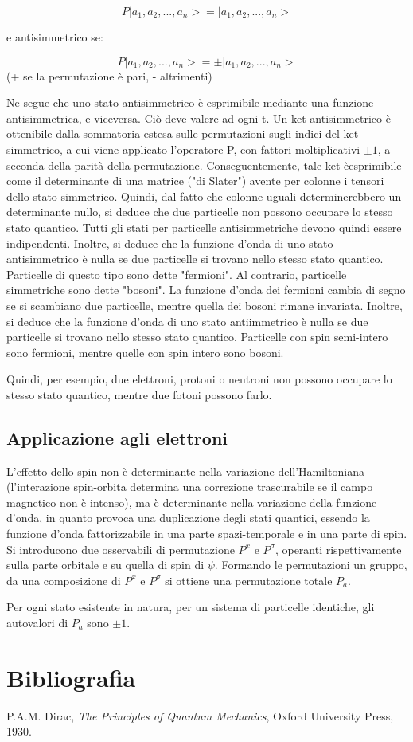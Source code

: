 \documentclass{article}
\begin{document}
\begin{equation}
    P|a_1,a_2,...,a_n>=|a_1,a_2,...,a_n>
\end{equation}

e antisimmetrico se:

\begin{equation}
    P|a_1,a_2,...,a_n>=\pm|a_1,a_2,...,a_n>
\end{equation}
(+ se la permutazione è pari, - altrimenti)

Ne segue che uno stato antisimmetrico è esprimibile mediante una funzione antisimmetrica, e viceversa.
Ciò deve valere ad ogni t.
Un ket antisimmetrico è ottenibile dalla sommatoria estesa sulle permutazioni sugli indici del ket simmetrico, a cui viene applicato l'operatore P, con fattori moltiplicativi $\pm 1$, a
seconda della parità della permutazione.
Conseguentemente, tale ket èesprimibile come il determinante di una matrice ("di Slater") avente per colonne i tensori dello stato simmetrico.
Quindi, dal fatto che colonne uguali determinerebbero un determinante nullo, si deduce che due particelle non possono occupare lo stesso stato quantico.
Tutti gli stati per particelle antisimmetriche devono quindi essere indipendenti.
Inoltre, si deduce che la funzione d'onda di uno stato antisimmetrico è nulla se due particelle si trovano nello stesso stato quantico.
Particelle di questo tipo sono dette "fermioni".
Al contrario, particelle simmetriche sono dette "bosoni".
La funzione d'onda dei fermioni cambia di segno se si scambiano due particelle, mentre quella dei bosoni rimane invariata.
Inoltre, si deduce che la funzione d'onda di uno stato antiimmetrico è nulla se due particelle si trovano nello stesso stato quantico.
Particelle con spin semi-intero sono fermioni, mentre quelle con spin intero sono bosoni.

Quindi, per esempio, due elettroni, protoni o neutroni non possono occupare lo stesso stato quantico, mentre due fotoni possono farlo.

\subsection*{Applicazione agli elettroni}
L'effetto dello spin non è determinante nella variazione dell'Hamiltoniana (l'interazione spin-orbita determina una correzione trascurabile se il campo
magnetico non è intenso), ma è determinante nella variazione della funzione d'onda, in quanto provoca una duplicazione degli stati quantici,
essendo la funzione d'onda fattorizzabile in una parte spazi-temporale e in una parte di spin.
Si introducono due osservabili di permutazione $P^x$ e $P^\sigma$, operanti rispettivamente sulla parte orbitale e su quella di spin di $\psi$.
Formando le permutazioni un gruppo, da una composizione di $P^x$ e $P^\sigma$ si ottiene una permutazione totale $P_a$.

Per ogni stato esistente in natura, per un sistema di particelle identiche, gli autovalori di $P_a$ sono $\pm 1$.



\section{Bibliografia}
\begin{thebibliography}{9}
     P.A.M. Dirac, \emph{The Principles of Quantum Mechanics}, Oxford University Press, 1930.
\end{thebibliography}
\end{document}
